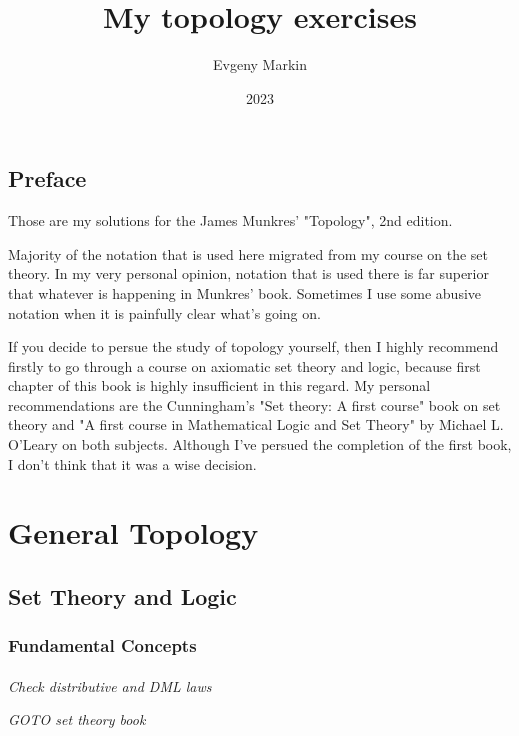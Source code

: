 \documentclass[11pt,oneside,titlepage]{book}
\title{My topology exercises}
\author{Evgeny Markin}
\date{2023}
\begin{document}
\maketitle
\tableofcontents

\chapter*{Preface}

Those are my solutions for the James Munkres' "Topology", 2nd edition.

Majority of the notation that is used here migrated from my course on the set theory. In
my very personal opinion, notation that is used there is far superior that whatever is
happening in Munkres' book. Sometimes I use some abusive notation when it is painfully
clear what's going on.

If you decide to persue the study of topology yourself, then I highly recommend firstly
to go through a course on axiomatic set theory and logic, because first chapter of this
book is highly insufficient in this regard. My personal recommendations are the
Cunningham's "Set theory: A first course" book on set theory and
"A first course in Mathematical Logic and Set Theory" by Michael L. O’Leary on both subjects.
Although I've persued the completion of the first book, I don't think that it was
a wise decision. 

\part{General Topology}

\chapter{Set Theory and Logic}


\section{Fundamental Concepts}

\subsection{}

\textit{Check distributive and DML laws}

\textit{GOTO set theory book}

\subsection{}
\end{document}
